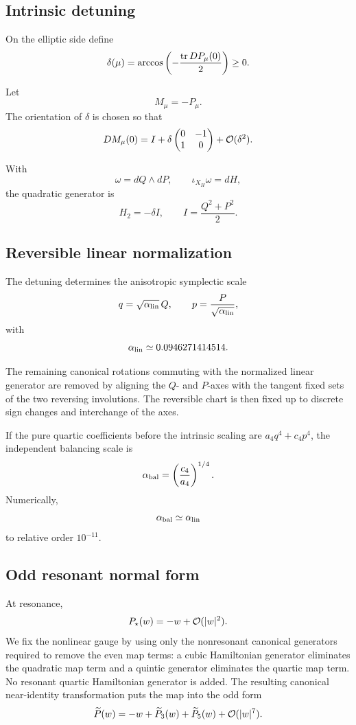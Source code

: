 \subsection{Intrinsic detuning}

On the elliptic side define
\[
\delta(\mu)
=
\arccos\left(-\frac{\operatorname{tr} DP_\mu(0)}{2}\right)\ge0.
\]

Let
\[
M_\mu=-P_\mu.
\]
The orientation of \(\delta\) is chosen so that
\[
DM_\mu(0)
=
I+\delta
\begin{pmatrix}
0&-1\\
1&0
\end{pmatrix}
+\mathcal{O}(\delta^2).
\]

With
\[
\omega=dQ\wedge dP,\qquad
\iota_{X_H}\omega=dH,
\]
the quadratic generator is
\begin{equation}
\boxed{
H_2=-\delta I,\qquad
I=\frac{Q^2+P^2}{2}.
}
\label{eq:H2}
\end{equation}

\subsection{Reversible linear normalization}

The detuning determines the anisotropic symplectic scale
\[
q=\sqrt{\alpha_{\rm lin}}\,Q,\qquad
p=\frac{P}{\sqrt{\alpha_{\rm lin}}},
\]
with
\[
\alpha_{\rm lin}\simeq0.0946271414514.
\]

The remaining canonical rotations commuting with the normalized linear generator are removed by aligning the \(Q\)- and \(P\)-axes with the tangent fixed sets of the two reversing involutions. The reversible chart is then fixed up to discrete sign changes and interchange of the axes.

If the pure quartic coefficients before the intrinsic scaling are \(a_4q^4+c_4p^4\), the independent balancing scale is
\[
\alpha_{\rm bal}
=
\left(\frac{c_4}{a_4}\right)^{1/4}.
\]
Numerically,
\[
\alpha_{\rm bal}\simeq\alpha_{\rm lin}
\]
to relative order \(10^{-11}\).

\subsection{Odd resonant normal form}

At resonance,
\[
P_\star(w)=-w+\mathcal{O}(|w|^2).
\]
We fix the nonlinear gauge by using only the nonresonant canonical generators required to remove the even map terms: a cubic Hamiltonian generator eliminates the quadratic map term and a quintic generator eliminates the quartic map term. No resonant quartic Hamiltonian generator is added. The resulting canonical near-identity transformation puts the map into the odd form
\[
\widetilde P(w)
=
-w+\widetilde P_3(w)+\widetilde P_5(w)+\mathcal{O}(|w|^7).
\]

